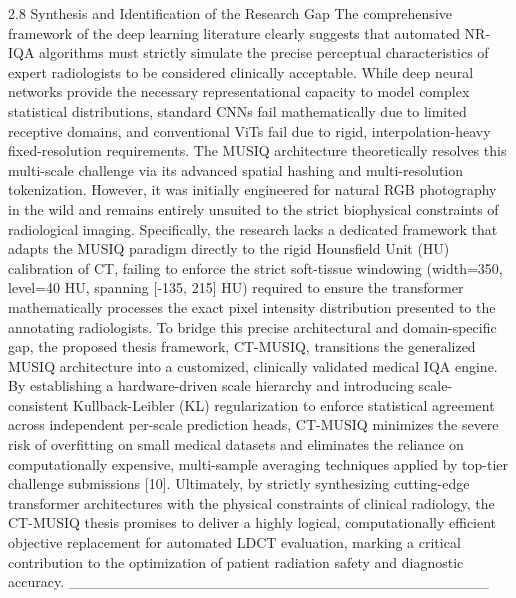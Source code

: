 2.8 Synthesis and Identification of the Research Gap The comprehensive framework of the deep learning literature clearly suggests that automated NR-IQA algorithms must strictly simulate the precise perceptual characteristics of expert radiologists to be considered clinically acceptable. While deep neural networks provide the necessary representational capacity to model complex statistical distributions, standard CNNs fail mathematically due to limited receptive domains, and conventional ViTs fail due to rigid, interpolation-heavy fixed-resolution requirements. The MUSIQ architecture theoretically resolves this multi-scale challenge via its advanced spatial hashing and multi-resolution tokenization. However, it was initially engineered for natural RGB photography in the wild and remains entirely unsuited to the strict biophysical constraints of radiological imaging. Specifically, the research lacks a dedicated framework that adapts the MUSIQ paradigm directly to the rigid Hounsfield Unit (HU) calibration of CT, failing to enforce the strict soft-tissue windowing (width=350, level=40 HU, spanning [-135, 215] HU) required to ensure the transformer mathematically processes the exact pixel intensity distribution presented to the annotating radiologists. To bridge this precise architectural and domain-specific gap, the proposed thesis framework, CT-MUSIQ, transitions the generalized MUSIQ architecture into a customized, clinically validated medical IQA engine. By establishing a hardware-driven scale hierarchy and introducing scale-consistent Kullback-Leibler (KL) regularization to enforce statistical agreement across independent per-scale prediction heads, CT-MUSIQ minimizes the severe risk of overfitting on small medical datasets and eliminates the reliance on computationally expensive, multi-sample averaging techniques applied by top-tier challenge submissions [10]. Ultimately, by strictly synthesizing cutting-edge transformer architectures with the physical constraints of clinical radiology, the CT-MUSIQ thesis promises to deliver a highly logical, computationally efficient objective replacement for automated LDCT evaluation, marking a critical contribution to the optimization of patient radiation safety and diagnostic accuracy.
________________________________________
